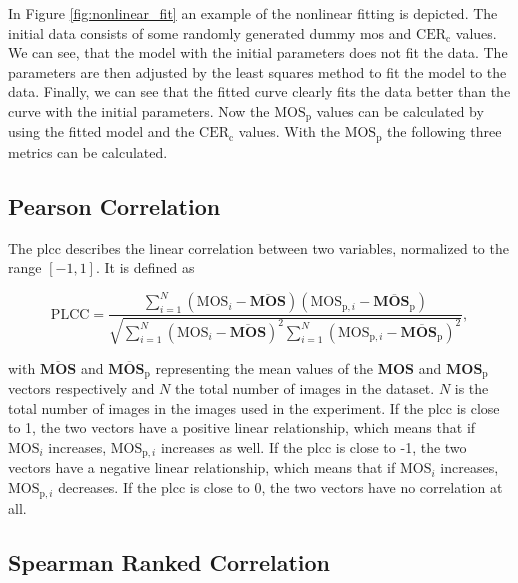 In Figure \ref{fig:nonlinear_fit} an example of the nonlinear fitting is depicted.
The initial data consists of some randomly generated dummy \gls{mos} and $\text{CER}_{\text{c}}$ values.
We can see, that the model with the initial parameters does not fit the data.
The parameters are then adjusted by the least squares method \cite{least_squares_1978} to fit the model to the data.
Finally, we can see that the fitted curve clearly fits the data better than the curve with the initial parameters.
Now the $\text{MOS}_{\text{p}}$ values can be calculated by using the fitted model and the $\text{CER}_{\text{c}}$ values.
With the $\text{MOS}_{\text{p}}$ the following three metrics \cite{iqa_survey_2021} can be calculated.

\subsection{Pearson Correlation}
\label{subsec:pearson}

The \gls{plcc} \cite{pears_spear_2016} describes the linear correlation between two variables, normalized to the range $[-1, 1]$.
It is defined as

\begin{equation}
    \text{PLCC} = \frac{\sum_{i=1}^{N}{(\text{MOS}_{i}-\overline{\mathbf{MOS}})(\text{MOS}_{\text{p},i}-\overline{\mathbf{MOS}_{\text{p}}})}}{\sqrt{\sum_{i=1}^{N}{(\text{MOS}_{i}-\overline{\mathbf{MOS}})^2}\sum_{i=1}^{N}{(\text{MOS}_{\text{p},i}-\overline{\mathbf{MOS}_{\text{p}}})^2}}},
    \label{eq:pearson}
\end{equation}

with $\overline{\mathbf{MOS}}$ and $\overline{\mathbf{MOS}_{\text{p}}}$ representing the mean values of the $\mathbf{MOS}$ and $\mathbf{MOS}_{\text{p}}$ vectors respectively and $N$ the total number of images in the dataset.
$N$ is the total number of images in the images used in the experiment.
If the \gls{plcc} is close to 1, the two vectors have a positive linear relationship, which means that if $\text{MOS}_{i}$ increases, $\text{MOS}_{\text{p},i}$ increases as well.
If the \gls{plcc} is close to -1, the two vectors have a negative linear relationship, which means that if $\text{MOS}_{i}$ increases, $\text{MOS}_{\text{p},i}$ decreases.
If the \gls{plcc} is close to 0, the two vectors have no correlation at all.

\subsection{Spearman Ranked Correlation}
\label{subsec:spearman}

